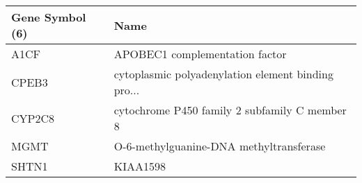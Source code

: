 \begin{tabular}{ll}
\toprule
Gene Symbol (6) &                                               Name \\
\midrule
           A1CF &                     APOBEC1 complementation factor \\
          CPEB3 & cytoplasmic polyadenylation element binding pro... \\
         CYP2C8 &      cytochrome P450 family 2 subfamily C member 8 \\
           MGMT &            O-6-methylguanine-DNA methyltransferase \\
          SHTN1 &                                           KIAA1598 \\
\bottomrule
\end{tabular}
